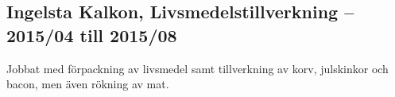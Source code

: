     \subsection*{\textcolor{colorTitelErfarenhet}{Ingelsta Kalkon, Livsmedelstillverkning – 2015/04 till 2015/08}}
      Jobbat med förpackning av livsmedel samt tillverkning av korv, julskinkor och bacon, men även rökning av mat.
    
    \vspace{15pt} %